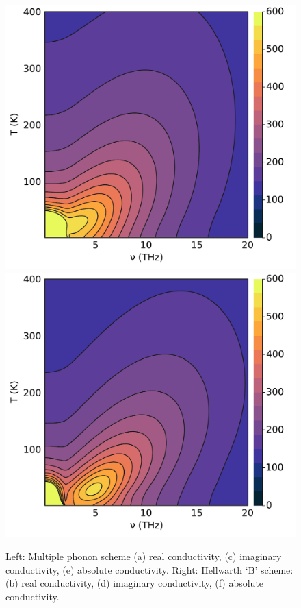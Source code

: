 \begin{figure}
    \includegraphics[width=.49\textwidth]{figures/multi_contour_abs.pdf}
    \includegraphics[width=.49\textwidth]{figures/B_contour_abs.pdf}
    \caption{Left: Multiple phonon scheme (a) real conductivity, (c) imaginary conductivity, (e) absolute conductivity. Right: Hellwarth `B' scheme: (b) real conductivity, (d) imaginary conductivity, (f) absolute conductivity.}
    \label{fig:multicontour}
\end{figure}

